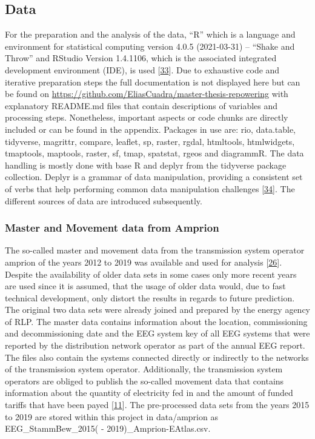 \documentclass[a4paper,11pt]{article}
\begin{document}
\hypertarget{data}{%
\subsection{Data}\label{data}}

For the preparation and the analysis of the data, ``R'' which is a language and environment for statistical computing version 4.0.5 (2021-03-31) -- ``Shake and Throw'' and RStudio Version 1.4.1106, which is the associated integrated development environment (IDE), is used {[}\protect\hyperlink{ref-R}{33}{]}. Due to exhaustive code and iterative preparation steps the full documentation is not displayed here but can be found on \url{https://github.com/EliasCuadra/master-thesis-repowering} with explanatory README.md files that contain descriptions of variables and processing steps. Nonetheless, important aspects or code chunks are directly included or can be found in the appendix. Packages in use are: rio, data.table, tidyverse, magrittr, compare, leaflet, sp, raster, rgdal, htmltools, htmlwidgets, tmaptools, maptools, raster, sf, tmap, spatstat, rgeos and diagrammR. The data handling is mostly done with base R and deplyr from the tidyverse package collection. Deplyr is a grammar of data manipulation, providing a consistent set of verbs that help performing common data manipulation challenges {[}\protect\hyperlink{ref-HadleyWickham.2021}{34}{]}. The different sources of data are introduced subsequently.

\hypertarget{master-and-movement-data-from-amprion}{%
\subsubsection{Master and Movement data from Amprion}\label{master-and-movement-data-from-amprion}}

The so-called master and movement data from the transmission system operator amprion of the years 2012 to 2019 was available and used for analysis {[}\protect\hyperlink{ref-EnergieagenturRheinlandPfalz.2019}{26}{]}. Despite the availability of older data sets in some cases only more recent years are used since it is assumed, that the usage of older data would, due to fast technical development, only distort the results in regards to future prediction. The original two data sets were already joined and prepared by the energy agency of RLP. The master data contains information about the location, commissioning and decommissioning date and the EEG system key of all EEG systems that were reported by the distribution network operator as part of the annual EEG report. The files also contain the systems connected directly or indirectly to the networks of the transmission system operator. Additionally, the transmission system operators are obliged to publish the so-called movement data that contains information about the quantity of electricity fed in and the amount of funded tariffs that have been payed {[}\protect\hyperlink{ref-AmprionGmbH.2019}{11}{]}. The pre-processed data sets from the years 2015 to 2019 are stored within this project in data/amprion as EEG\_StammBew\_2015( - 2019)\_Amprion-EAtlas.csv.
\end{document}
